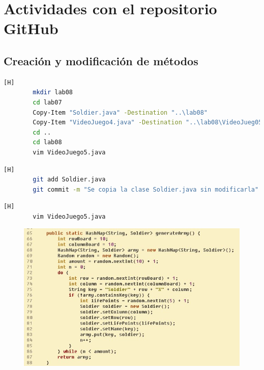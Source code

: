 \documentclass{article}
\begin{document}
	\section{Actividades con el repositorio GitHub}
	
	\subsection{Creación y modificación de métodos}
	
	\begin{lstlisting}[language=bash,caption={Inicializando el espacio de trabajo}][H]
		mkdir lab08
		cd lab07
		Copy-Item "Soldier.java" -Destination "..\lab08"
		Copy-Item "VideoJuego4.java" -Destination "..\lab08\VideoJueg05.java"
		cd ..
		cd lab08
		vim VideoJuego5.java
	\end{lstlisting}
	
	\begin{lstlisting}[language=bash,caption={Commit: 04c6fccaf0efb49ff5850c22d6d70e304656daff }][H]
		git add Soldier.java
		git commit -m "Se copia la clase Soldier.java sin modificarla"
	\end{lstlisting}
	
	\begin{lstlisting}[language=bash,caption={Se modifica el método que genera un HashMap cuya llave es un String y el elemento es un Soldier }][H]
		vim VideoJuego5.java
	\end{lstlisting}
	\begin{figure}[H]
		\centering
		\includegraphics[width=1\textwidth,keepaspectratio]{img/generateArmy.jpg}
	\end{figure}
	
\end{document}
